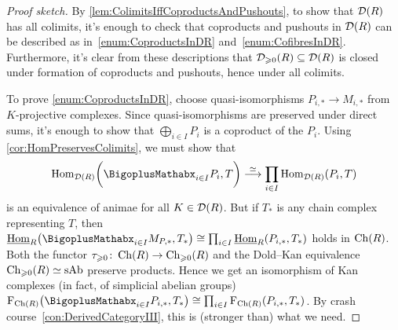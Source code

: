 \begin{proof}[Proof sketch]
	By \cref{lem:ColimitsIffCoproductsAndPushouts}, to show that $\mathcal{D}(R)$ has all colimits, it's enough to check that coproducts and pushouts in $\mathcal{D}(R)$ can be described as in~\cref{enum:CoproductsInDR} and~\cref{enum:CofibresInDR}. Furthermore, it's clear from these descriptions that $\mathcal{D}_{\geqslant 0}(R)\subseteq \mathcal{D}(R)$ is closed under formation of coproducts and pushouts, hence under all colimits.
	
	To prove \cref{enum:CoproductsInDR}, choose quasi-isomorphisms $P_{i,*}\rightarrow M_{i,*}$ from $K$-projective complexes. Since quasi-isomorphisms are preserved under direct sums, it's enough to show that $\bigoplus_{i\in I}P_i$ is a coproduct of the $P_i$. Using \cref{cor:HomPreservesColimits}, we must show that 
	\begin{equation*}
		\Hom_{\Dd(R)}\biggl(\bigoplus_{i\in I}P_i,T\biggr)\overset{\simeq}{\longrightarrow}\prod_{i\in I}\Hom_{\Dd(R)}(P_i,T)
	\end{equation*}
	is an equivalence of animae for all $K\in\mathcal{D}(R)$. But if $T_*$ is any chain complex representing $T$, then $\Hhom_R\bigl(\bigoplus_{i\in I}M_{P,*},T_*\bigr)\cong \prod_{i\in I}\Hhom_R(P_{i,*},T_*)$ holds in $\operatorname{Ch}(R)$. Both the functor $\tau_{\geqslant 0}\colon \operatorname{Ch}(R)\rightarrow \operatorname{Ch}_{\geqslant 0}(R)$ and the Dold--Kan equivalence $\operatorname{Ch}_{\geqslant 0}(R)\simeq \mathrm{sAb}$ preserve products. Hence we get an isomorphism of Kan complexes (in fact, of simplicial abelian groups) $\F_{\Ch(R)}\bigl(\bigoplus_{i\in I} P_{i,*},T_*\bigr)\cong \prod_{i\in I}\F_{\Ch(R)}(P_{i,*},T_*)$. By crash course~\cref{con:DerivedCategoryIII}, this is (stronger than) what we need.
	

\end{proof}
